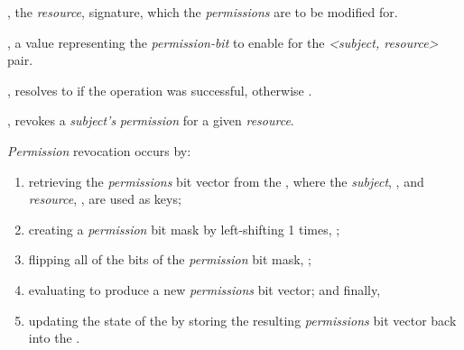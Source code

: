 \begin{code}
\begin{functions}
\begin{parameters}
        \item {}, the \emph{resource}, 
          signature, which the \emph{permissions} are to be modified for.

        \item {}, a  value representing the
          \emph{permission-bit} to enable for the \emph{<subject, resource>}
          pair.
      \end{parameters}

      \begin{returns}
      \item {}, resolves to  if the operation was
        successful, otherwise .
      \end{returns}

    \item {},
      revokes a \emph{subject's} \emph{permission} for a given \emph{resource}.

      \begin{displayquote}
        \emph{Permission} revocation occurs by:
        \begin{enumerate}
          \item retrieving the \emph{permissions} bit vector from the
             , where the
            \emph{subject}, , and \emph{resource},
            , are used as keys;

          \item creating a \emph{permission} bit mask by left-shifting 1
             times, ;

          \item flipping all of the bits of the \emph{permission} bit mask,
            ;

          \item evaluating  to produce a new
            \emph{permissions} bit vector; and finally,

          \item updating the state of the  by storing the
            resulting \emph{permissions} bit vector back into the
             .
        \end{enumerate}
      \end{displayquote}


\end{functions}
\end{code}
